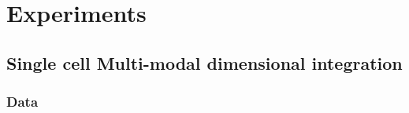 \chapter{Experiments}
\label{chapter:experiments}

\graphicspath{{chapter4/figs}}


\section{Single cell Multi-modal dimensional integration}

\subsection{Data}

